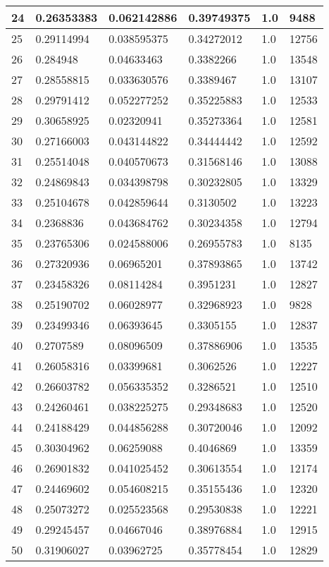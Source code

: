 \begin{longtable}{|l|l|l|l|l|l|}
24 & 0.26353383 & 0.062142886 & 0.39749375 & 1.0 & 9488 \\ \hline 
25 & 0.29114994 & 0.038595375 & 0.34272012 & 1.0 & 12756 \\ \hline 
26 & 0.284948 & 0.04633463 & 0.3382266 & 1.0 & 13548 \\ \hline 
27 & 0.28558815 & 0.033630576 & 0.3389467 & 1.0 & 13107 \\ \hline 
28 & 0.29791412 & 0.052277252 & 0.35225883 & 1.0 & 12533 \\ \hline 
29 & 0.30658925 & 0.02320941 & 0.35273364 & 1.0 & 12581 \\ \hline 
30 & 0.27166003 & 0.043144822 & 0.34444442 & 1.0 & 12592 \\ \hline 
31 & 0.25514048 & 0.040570673 & 0.31568146 & 1.0 & 13088 \\ \hline 
32 & 0.24869843 & 0.034398798 & 0.30232805 & 1.0 & 13329 \\ \hline 
33 & 0.25104678 & 0.042859644 & 0.3130502 & 1.0 & 13223 \\ \hline 
34 & 0.2368836 & 0.043684762 & 0.30234358 & 1.0 & 12794 \\ \hline 
35 & 0.23765306 & 0.024588006 & 0.26955783 & 1.0 & 8135 \\ \hline 
36 & 0.27320936 & 0.06965201 & 0.37893865 & 1.0 & 13742 \\ \hline 
37 & 0.23458326 & 0.08114284 & 0.3951231 & 1.0 & 12827 \\ \hline 
38 & 0.25190702 & 0.06028977 & 0.32968923 & 1.0 & 9828 \\ \hline 
39 & 0.23499346 & 0.06393645 & 0.3305155 & 1.0 & 12837 \\ \hline 
40 & 0.2707589 & 0.08096509 & 0.37886906 & 1.0 & 13535 \\ \hline 
41 & 0.26058316 & 0.03399681 & 0.3062526 & 1.0 & 12227 \\ \hline 
42 & 0.26603782 & 0.056335352 & 0.3286521 & 1.0 & 12510 \\ \hline 
43 & 0.24260461 & 0.038225275 & 0.29348683 & 1.0 & 12520 \\ \hline 
44 & 0.24188429 & 0.044856288 & 0.30720046 & 1.0 & 12092 \\ \hline 
45 & 0.30304962 & 0.06259088 & 0.4046869 & 1.0 & 13359 \\ \hline 
46 & 0.26901832 & 0.041025452 & 0.30613554 & 1.0 & 12174 \\ \hline 
47 & 0.24469602 & 0.054608215 & 0.35155436 & 1.0 & 12320 \\ \hline 
48 & 0.25073272 & 0.025523568 & 0.29530838 & 1.0 & 12221 \\ \hline 
49 & 0.29245457 & 0.04667046 & 0.38976884 & 1.0 & 12915 \\ \hline 
50 & 0.31906027 & 0.03962725 & 0.35778454 & 1.0 & 12829 \\ \hline 
\end{longtable}